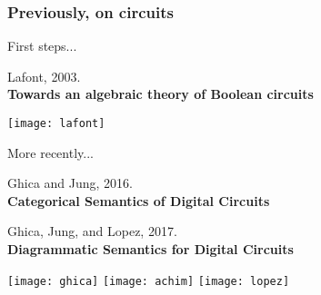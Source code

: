 \begin{frame}
    \frametitle{Previously, on circuits}

    \pause

    \begin{minipage}{0.65\textwidth}
        First steps...

        \vspace{0.5em}

        Lafont, 2003. \\
        \textbf{Towards an algebraic theory of Boolean circuits}
    \end{minipage}
    \quad
    \begin{minipage}{0.3\textwidth}
        \texttt{[image: lafont]}
    \end{minipage}

    \vspace{2em}

    \pause

    \begin{minipage}{0.65\textwidth}
        More recently...

        \vspace{0.5em}

        Ghica and Jung, 2016. \\
        \textbf{Categorical Semantics of Digital Circuits}

        Ghica, Jung, and Lopez, 2017. \\
        \textbf{Diagrammatic Semantics for Digital Circuits}
    \end{minipage}
    \quad
    \begin{minipage}{0.3\textwidth}
        \texttt{[image: ghica]}
        \texttt{[image: achim]}
        \texttt{[image: lopez]}
    \end{minipage}

\end{frame}

